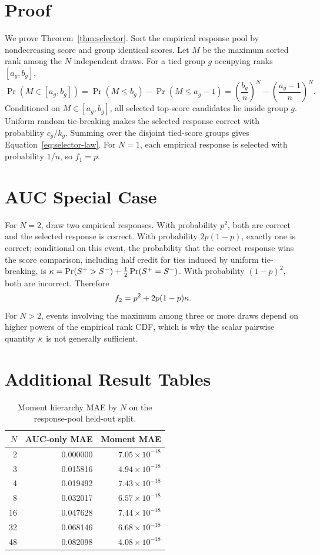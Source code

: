 \section{Proof}
\label{app:proof}

We prove Theorem~\ref{thm:selector}. Sort the empirical response pool by
nondecreasing score and group identical scores. Let $M$ be the maximum sorted
rank among the $N$ independent draws. For a tied group $g$ occupying ranks
$[a_g,b_g]$,
\[
\Pr(M\in[a_g,b_g])
=
\Pr(M\leq b_g)-\Pr(M\leq a_g-1)
=
\left(\frac{b_g}{n}\right)^N
-
\left(\frac{a_g-1}{n}\right)^N .
\]
Conditioned on $M\in[a_g,b_g]$, all selected top-score candidates lie inside
group $g$. Uniform random tie-breaking makes the selected response correct
with probability $c_g/k_g$. Summing over the disjoint tied-score groups gives
Equation~\ref{eq:selector-law}. For $N=1$, each empirical response is selected
with probability $1/n$, so $f_1=p$.

\section{AUC Special Case}
\label{app:auc}

For $N=2$, draw two empirical responses. With probability $p^2$, both are
correct and the selected response is correct. With probability
$2p(1-p)$, exactly one is correct; conditional on this event, the probability
that the correct response wins the score comparison, including half credit for
ties induced by uniform tie-breaking, is
$\kappa=\Pr(S^+>S^-)+\frac{1}{2}\Pr(S^+=S^-)$. With probability
$(1-p)^2$, both are incorrect. Therefore
\[
f_2 = p^2 + 2p(1-p)\kappa .
\]
For $N>2$, events involving the maximum among three or more draws depend on
higher powers of the empirical rank CDF, which is why the scalar pairwise
quantity $\kappa$ is not generally sufficient.

\section{Additional Result Tables}
\label{app:tables}

\begin{table}[t]
\centering
\caption{Moment hierarchy MAE by $N$ on the response-pool held-out split.}
\label{tab:moment-values}
\begin{tabular}{r r r}
\toprule
$N$ & AUC-only MAE & Moment MAE \\
\midrule
2 & 0.000000 & $7.05\times10^{-18}$ \\
3 & 0.015816 & $4.94\times10^{-18}$ \\
4 & 0.019492 & $7.43\times10^{-18}$ \\
8 & 0.032017 & $6.57\times10^{-18}$ \\
16 & 0.047628 & $7.44\times10^{-18}$ \\
32 & 0.068146 & $6.68\times10^{-18}$ \\
48 & 0.082098 & $4.08\times10^{-18}$ \\
\bottomrule
\end{tabular}
\end{table}

